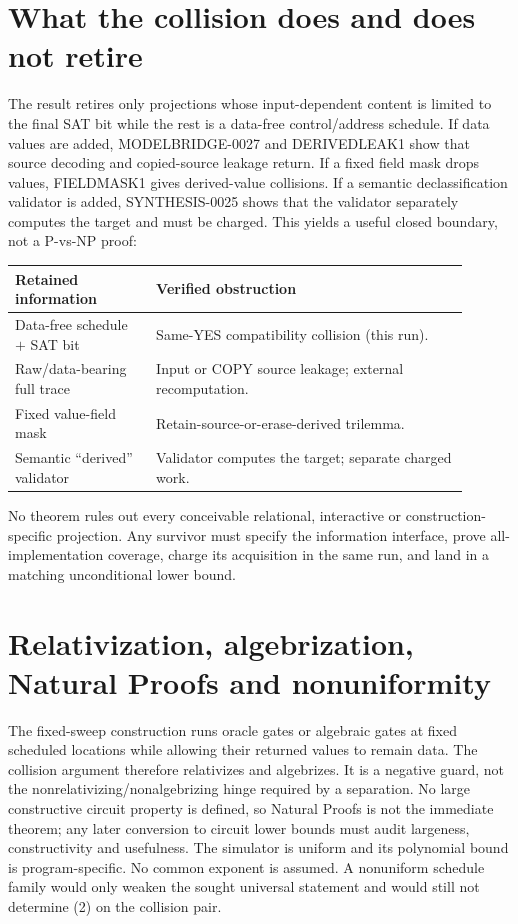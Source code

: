 \documentclass[11pt]{article}
\begin{document}
\section{What the collision does and does not retire}
The result retires only projections whose input-dependent content is limited
to the final SAT bit while the rest is a data-free control/address schedule.
If data values are added, MODELBRIDGE-0027 and DERIVEDLEAK1 show that source
decoding and copied-source leakage return.  If a fixed field mask drops values,
FIELDMASK1 gives derived-value collisions.  If a semantic declassification
validator is added, SYNTHESIS-0025 shows that the validator separately computes
the target and must be charged.  This yields a useful closed boundary, not a
P-vs-NP proof:
\begin{center}
\begin{tabular}{@{}p{0.28\linewidth}p{0.62\linewidth}@{}}\toprule
Retained information & Verified obstruction\\ \midrule
Data-free schedule $+$ SAT bit & Same-YES compatibility collision (this run).\\
Raw/data-bearing full trace & Input or COPY source leakage; external recomputation.\\
Fixed value-field mask & Retain-source-or-erase-derived trilemma.\\
Semantic ``derived'' validator & Validator computes the target; separate charged work.\\
\bottomrule
\end{tabular}
\end{center}
No theorem rules out every conceivable relational, interactive or
construction-specific projection.  Any survivor must specify the information
interface, prove all-implementation coverage, charge its acquisition in the
same run, and land in a matching unconditional lower bound.

\section{Relativization, algebrization, Natural Proofs and nonuniformity}
The fixed-sweep construction runs oracle gates or algebraic gates at fixed
scheduled locations while allowing their returned values to remain data.  The
collision argument therefore relativizes and algebrizes.  It is a negative
guard, not the nonrelativizing/nonalgebrizing hinge required by a separation.
No large constructive circuit property is defined, so Natural Proofs is not
the immediate theorem; any later conversion to circuit lower bounds must audit
largeness, constructivity and usefulness.  The simulator is uniform and its
polynomial bound is program-specific.  No common exponent is assumed.  A
nonuniform schedule family would only weaken the sought universal statement
and would still not determine (2) on the collision pair.
\end{document}
